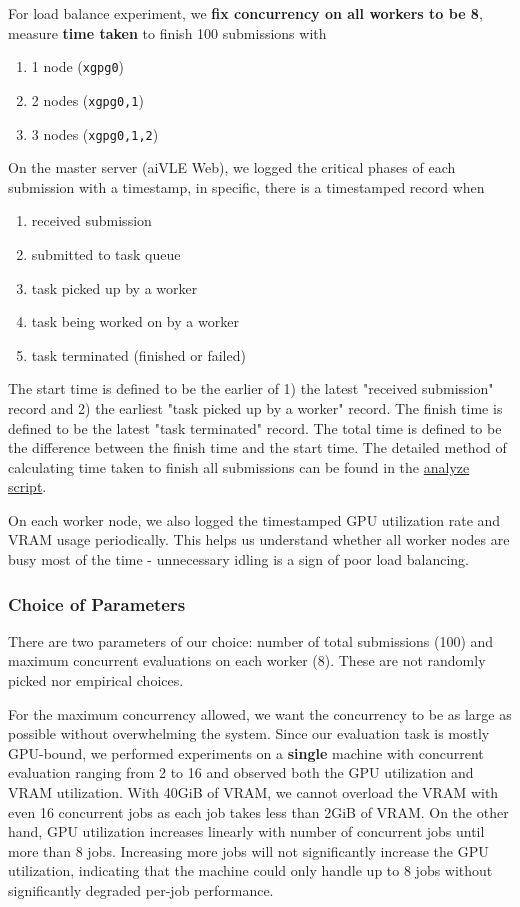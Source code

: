 For load balance experiment, we \textbf{fix concurrency on all workers to be 8}, measure \textbf{time taken} to finish 100 submissions with
\begin{enumerate}
    \item 1 node (\texttt{xgpg0})
    \item 2 nodes (\texttt{xgpg0,1})
    \item 3 nodes (\texttt{xgpg0,1,2})
\end{enumerate}

On the master server (aiVLE Web), we logged the critical phases of each submission with a timestamp, in specific, there is a timestamped record when
\begin{enumerate}
    \item received submission
    \item submitted to task queue
    \item task picked up by a worker
    \item task being worked on by a worker
    \item task terminated (finished or failed)
\end{enumerate}

The start time is defined to be the earlier of 1) the latest "received submission" record and 2) the earliest "task picked up by a worker" record. The finish time is defined to be the latest "task terminated" record. The total time is defined to be the difference between the finish time and the start time. The detailed method of calculating time taken to finish all submissions can be found in the \href{https://github.com/edu-ai/aivle-experiment-logs/blob/main/web/analyze.ipynb}{analyze script}.

On each worker node, we also logged the timestamped GPU utilization rate and VRAM usage periodically. This helps us understand whether all worker nodes are busy most of the time - unnecessary idling is a sign of poor load balancing.

\subsubsection{Choice of Parameters}
\label{sss:choice-of-params}

There are two parameters of our choice: number of total submissions (100) and maximum concurrent evaluations on each worker (8). These are not randomly picked nor empirical choices.

For the maximum concurrency allowed, we want the concurrency to be as large as possible without overwhelming the system. Since our evaluation task is mostly GPU-bound, we performed experiments on a \textbf{single} machine with concurrent evaluation ranging from 2 to 16 and observed both the GPU utilization and VRAM utilization. With 40GiB of VRAM, we cannot overload the VRAM with even 16 concurrent jobs as each job takes less than 2GiB of VRAM. On the other hand, GPU utilization increases linearly with number of concurrent jobs until more than 8 jobs. Increasing more jobs will not significantly increase the GPU utilization, indicating that the machine could only handle up to 8 jobs without significantly degraded per-job performance.

